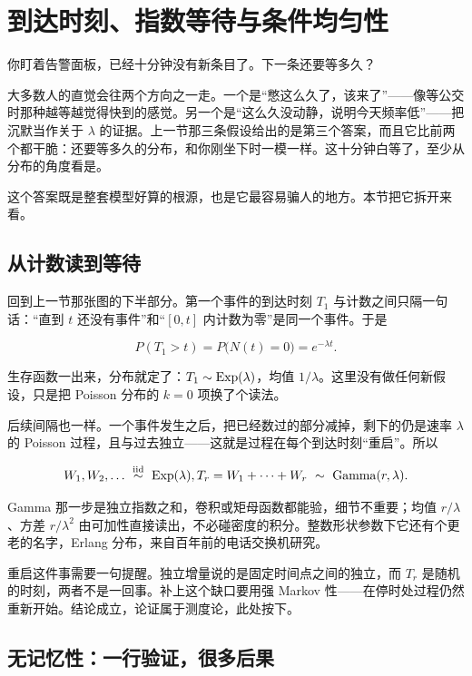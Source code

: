 \section{到达时刻、指数等待与条件均匀性}
\label{sec:06-Random-Processes/02-Counting-Processes/03}

你盯着告警面板，已经十分钟没有新条目了。下一条还要等多久？

大多数人的直觉会往两个方向之一走。一个是``憋这么久了，该来了''——像等公交时那种越等越觉得快到的感觉。另一个是``这么久没动静，说明今天频率低''——把沉默当作关于 \(\lambda\) 的证据。上一节那三条假设给出的是第三个答案，而且它比前两个都干脆：还要等多久的分布，和你刚坐下时一模一样。这十分钟白等了，至少从分布的角度看是。

这个答案既是整套模型好算的根源，也是它最容易骗人的地方。本节把它拆开来看。

\subsection{从计数读到等待}

回到上一节那张图的下半部分。第一个事件的到达时刻 \(T_1\) 与计数之间只隔一句话：``直到 \(t\) 还没有事件''和``\([0,t]\) 内计数为零''是同一个事件。于是

\[
P(T_1>t)=P\bigl(N(t)=0\bigr)=e^{-\lambda t}.
\]

生存函数一出来，分布就定了：\(T_1\sim\operatorname{Exp}(\lambda)\)，均值 \(1/\lambda\)。这里没有做任何新假设，只是把 Poisson 分布的 \(k=0\) 项换了个读法。

后续间隔也一样。一个事件发生之后，把已经数过的部分减掉，剩下的仍是速率 \(\lambda\) 的 Poisson 过程，且与过去独立——这就是过程在每个到达时刻``重启''。所以

\[
W_1,W_2,\ldots\ \overset{\iid}{\sim}\ \Exp(\lambda),
\qquad
T_r=W_1+\cdots+W_r\ \sim\ \operatorname{Gamma}(r,\lambda).
\]

Gamma 那一步是独立指数之和，卷积或矩母函数都能验，细节不重要；均值 \(r/\lambda\)、方差 \(r/\lambda^2\) 由可加性直接读出，不必碰密度的积分。整数形状参数下它还有个更老的名字，Erlang 分布，来自百年前的电话交换机研究。

重启这件事需要一句提醒。独立增量说的是固定时间点之间的独立，而 \(T_r\) 是随机的时刻，两者不是一回事。补上这个缺口要用强 Markov 性——在停时处过程仍然重新开始。结论成立，论证属于测度论，此处按下。

\subsection{无记忆性：一行验证，很多后果}

